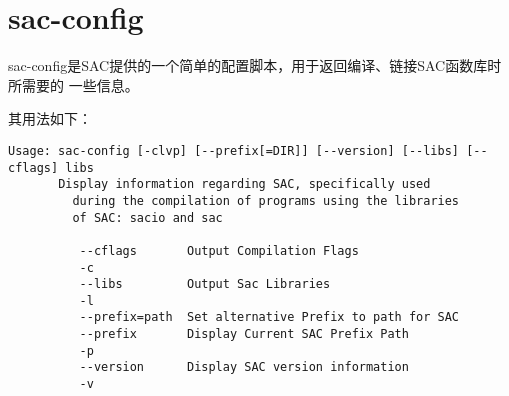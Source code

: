 \section{sac-config}
\label{sec:sac-config}

sac-config是SAC提供的一个简单的配置脚本，用于返回编译、链接SAC函数库时所需要的
一些信息。

其用法如下：
\begin{verbatim}
Usage: sac-config [-clvp] [--prefix[=DIR]] [--version] [--libs] [--cflags] libs 
       Display information regarding SAC, specifically used
         during the compilation of programs using the libraries
         of SAC: sacio and sac

          --cflags       Output Compilation Flags
          -c 
          --libs         Output Sac Libraries
          -l
          --prefix=path  Set alternative Prefix to path for SAC
          --prefix       Display Current SAC Prefix Path
          -p
          --version      Display SAC version information
          -v
\end{verbatim}

